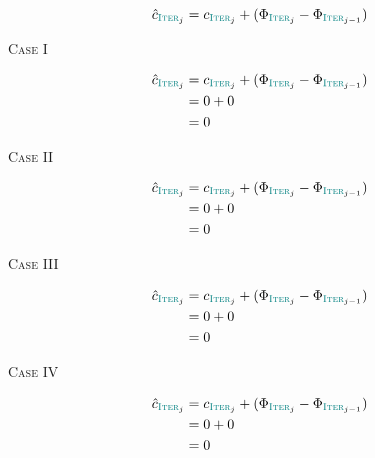 \begin{frame}{}
  \[
    \hat{c}_{\textsc{\textcolor{teal}{Iter}}_{j}} =  c_{\textsc{\textcolor{teal}{Iter}}_{j}} + (\Phi_{\textsc{\textcolor{teal}{Iter}}_{j}} - \Phi_{\textsc{\textcolor{teal}{Iter}}_{j-1}})
  \]

  \pause
  \vspace{0.60cm}
\end{frame}

\begin{frame}{}

  \centerline{\textsc{Case I}}

  \pause
  \begin{align*}
    \hat{c}_{\textsc{\textcolor{teal}{Iter}}_{j}} &=  c_{\textsc{\textcolor{teal}{Iter}}_{j}} + (\Phi_{\textsc{\textcolor{teal}{Iter}}_{j}} - \Phi_{\textsc{\textcolor{teal}{Iter}}_{j-1}}) \\
	&= 0 + 0 \\
	&= 0
  \end{align*}
\end{frame}

\begin{frame}{}

  \centerline{\textsc{Case II}}

  \pause
  \begin{align*}
    \hat{c}_{\textsc{\textcolor{teal}{Iter}}_{j}} &=  c_{\textsc{\textcolor{teal}{Iter}}_{j}} + (\Phi_{\textsc{\textcolor{teal}{Iter}}_{j}} - \Phi_{\textsc{\textcolor{teal}{Iter}}_{j-1}}) \\
	&= 0 + 0 \\
	&= 0
  \end{align*}
\end{frame}

\begin{frame}{}

  \centerline{\textsc{Case III}}

  \pause
  \begin{align*}
    \hat{c}_{\textsc{\textcolor{teal}{Iter}}_{j}} &=  c_{\textsc{\textcolor{teal}{Iter}}_{j}} + (\Phi_{\textsc{\textcolor{teal}{Iter}}_{j}} - \Phi_{\textsc{\textcolor{teal}{Iter}}_{j-1}}) \\
	&= 0 + 0 \\
	&= 0
  \end{align*}
\end{frame}

\begin{frame}{}

  \centerline{\textsc{Case IV}}

  \pause
  \begin{align*}
    \hat{c}_{\textsc{\textcolor{teal}{Iter}}_{j}} &=  c_{\textsc{\textcolor{teal}{Iter}}_{j}} + (\Phi_{\textsc{\textcolor{teal}{Iter}}_{j}} - \Phi_{\textsc{\textcolor{teal}{Iter}}_{j-1}}) \\
	&= 0 + 0 \\
	&= 0
  \end{align*}
\end{frame}

\begin{frame}{}
\end{frame}

\begin{frame}{}
\end{frame}
